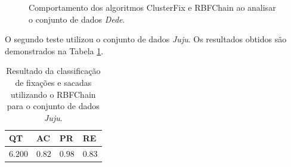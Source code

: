\documentclass[msc, classic, a4paper]{ufbathesis}
\begin{document}
\begin{figure}[ht]%
\centering
{}%
\qquad
{}%
\caption{Comportamento dos algoritmos ClusterFix e RBFChain ao analisar o conjunto de dados \textit{Dede}.}
\label{fig:comparacao_dede}%
\end{figure}

O segundo teste utilizou o conjunto de dados \textit{Juju}.
Os resultados obtidos são demonstrados na Tabela \ref{tbl:juju}.

\newpage

\begin{table}[ht!]
\centering
\caption{Resultado da classificação de fixações e sacadas utilizando o RBFChain para o conjunto de dados \textit{Juju}.}
\label{tbl:juju}
\begin{tabular}{llll}

\toprule
QT              & AC                     & PR                     & RE      \\ 
\midrule
$6.200$         & $0.82$                 & $0.98$                 & $0.83$      \\ 
\bottomrule

\end{tabular}
\end{table}
\end{document}
